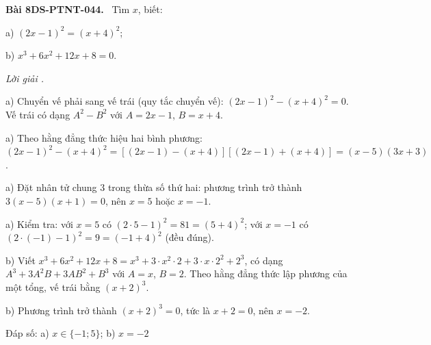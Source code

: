 \documentclass[12pt,a4paper]{article}
\newenvironment{problem}[1][]{\par\medskip\noindent\textbf{Bài #1.}\ }{\par}
\newenvironment{solution}[1][]{\par\noindent\textit{Lời giải #1.}\par}{\par}
\begin{document}
\begin{problem}[8DS-PTNT-044]
Tìm $x$, biết:

a) $(2x - 1)^2 = (x + 4)^2$;

b) $x^3 + 6x^2 + 12x + 8 = 0$.

\begin{solution}
a) Chuyển vế phải sang vế trái (quy tắc chuyển vế): $(2x - 1)^2 - (x + 4)^2 = 0$. Vế trái có dạng $A^2 - B^2$ với $A = 2x - 1$, $B = x + 4$.

a) Theo hằng đẳng thức hiệu hai bình phương: $(2x - 1)^2 - (x + 4)^2 = \left[(2x - 1) - (x + 4)\right]\left[(2x - 1) + (x + 4)\right] = (x - 5)(3x + 3)$.

a) Đặt nhân tử chung $3$ trong thừa số thứ hai: phương trình trở thành $3(x - 5)(x + 1) = 0$, nên $x = 5$ hoặc $x = -1$.

a) Kiểm tra: với $x = 5$ có $(2 \cdot 5 - 1)^2 = 81 = (5 + 4)^2$; với $x = -1$ có $(2 \cdot (-1) - 1)^2 = 9 = (-1 + 4)^2$ (đều đúng).

b) Viết $x^3 + 6x^2 + 12x + 8 = x^3 + 3 \cdot x^2 \cdot 2 + 3 \cdot x \cdot 2^2 + 2^3$, có dạng $A^3 + 3A^2B + 3AB^2 + B^3$ với $A = x$, $B = 2$. Theo hằng đẳng thức lập phương của một tổng, vế trái bằng $(x + 2)^3$.

b) Phương trình trở thành $(x + 2)^3 = 0$, tức là $x + 2 = 0$, nên $x = -2$.

Đáp số: a) $\boxed{x \in \{-1; 5\}}$; b) $\boxed{x = -2}$
\end{solution}
\end{problem}
\end{document}
